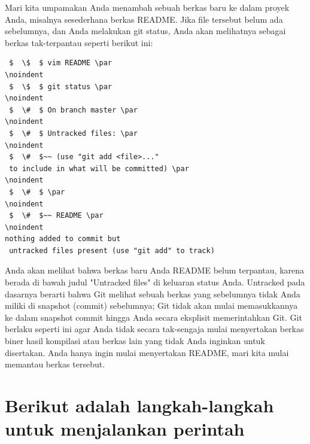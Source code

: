 Mari kita umpamakan Anda menambah sebuah berkas baru ke dalam proyek Anda, misalnya sesederhana berkas README. Jika file tersebut belum ada sebelumnya, dan Anda melakukan git status, Anda akan melihatnya sebagai berkas tak-terpantau seperti berikut ini: \par
\vspace{12pt}
\noindent 
\begin{verbatim}
 $  \$  $ vim README \par
\noindent 
 $  \$  $ git status \par
\noindent 
 $  \#  $ On branch master \par
\noindent 
 $  \#  $ Untracked files: \par
\noindent 
 $  \#  $~~ (use "git add <file>..." 
 to include in what will be committed) \par
\noindent 
 $  \#  $ \par
\noindent 
 $  \#  $~~ README \par
\noindent 
nothing added to commit but
 untracked files present (use "git add" to track) 

\end{verbatim}
Anda akan melihat bahwa berkas baru Anda README belum terpantau, karena berada di bawah judul "Untracked files" di keluaran status Anda. Untracked pada dasarnya berarti bahwa Git melihat sebuah berkas yang sebelumnya tidak Anda miliki di snapshot (commit) sebelumnya; Git tidak akan mulai memasukkannya ke dalam snapshot commit hingga Anda secara eksplisit memerintahkan Git. Git berlaku seperti ini agar Anda tidak secara tak-sengaja mulai menyertakan berkas biner hasil kompilasi atau berkas lain yang tidak Anda inginkan untuk disertakan. Anda hanya ingin mulai menyertakan README, mari kita mulai memantau berkas tersebut. \par
\vspace{12pt}
\noindent 
 \section{Berikut adalah langkah-langkah untuk menjalankan perintah}
 
